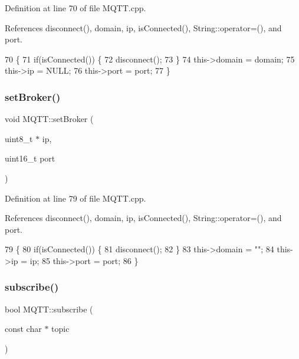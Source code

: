 Definition at line 70 of file M\+Q\+T\+T.\+cpp.



References disconnect(), domain, ip, is\+Connected(), String\+::operator=(), and port.


\begin{DoxyCode}
70                                                 \{
71     \textcolor{keywordflow}{if}(isConnected()) \{
72         disconnect();
73     \}
74     this->domain = domain;
75     this->ip = NULL;
76     this->port = port;
77 \}
\end{DoxyCode}
\mbox{\label{class_m_q_t_t_ad17765f1a34eacf2f0a3b384181a7129}} 
\subsubsection{set\+Broker()\hspace{0.1cm}{\footnotesize\ttfamily [2/2]}}
{\footnotesize\ttfamily void M\+Q\+T\+T\+::set\+Broker (\begin{DoxyParamCaption}\item[{uint8\+\_\+t $\ast$}]{ip,  }\item[{uint16\+\_\+t}]{port }\end{DoxyParamCaption})}



Definition at line 79 of file M\+Q\+T\+T.\+cpp.



References disconnect(), domain, ip, is\+Connected(), String\+::operator=(), and port.


\begin{DoxyCode}
79                                                \{
80     \textcolor{keywordflow}{if}(isConnected()) \{
81         disconnect();
82     \}
83     this->domain = \textcolor{stringliteral}{""};
84     this->ip = ip;
85     this->port = port;
86 \}
\end{DoxyCode}
\mbox{\label{class_m_q_t_t_aad37921199d922122e1d390883ab6591}} 
\subsubsection{subscribe()\hspace{0.1cm}{\footnotesize\ttfamily [1/2]}}
{\footnotesize\ttfamily bool M\+Q\+T\+T\+::subscribe (\begin{DoxyParamCaption}\item[{const char $\ast$}]{topic }\end{DoxyParamCaption})}



